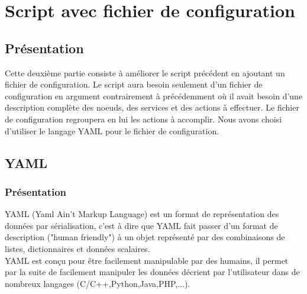 \documentclass[a4paper,11pt]{article}
\begin{document}
\pagebreak


\section{Script avec fichier de configuration}
\label{sec:section4}
\subsection{Présentation}
\label{sub:4.1}
\noindent
Cette deuxième partie consiste à améliorer le script précédent en ajoutant un fichier de configuration. Le script aura besoin seulement d'un fichier de configuration en argument contrairement à précédemment où il avait besoin d'une description complète des noeuds, des services et des actions à effectuer. Le fichier de configuration regroupera en lui les actions à accomplir. Nous avons choisi d'utiliser le langage YAML pour le fichier de configuration.

\subsection{YAML}
\label{sub:4.2}
\subsubsection{Présentation}
\label{subsub:4.2.1}
\noindent
YAML (Yaml Ain't Markup Language) est un format de représentation des données par sérialisation, c'est à dire que YAML fait passer d'un format de description ("human friendly") à un objet représenté par des combinaisons de listes, dictionnaires et données scalaires. 
\\
YAML est conçu pour être facilement manipulable par des humains, il permet par la suite de facilement manipuler les données décrient par l'utilisateur dans de nombreux langages (C/C++,Python,Java,PHP,...).
\end{document}
